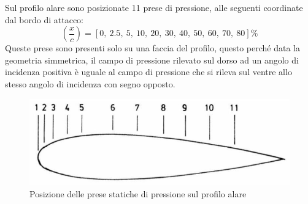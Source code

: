 \noindent Sul profilo alare sono posizionate 11 prese di pressione, alle seguenti coordinate dal bordo di attacco:
\begin{equation*}
    \left( \frac xc \right) = [0,\ 2.5,\ 5,\ 10,\ 20,\ 30,\ 40,\ 50,\ 60,\ 70,\ 80] \%
\end{equation*}
Queste prese sono presenti solo su una faccia del profilo, questo perché data la geometria simmetrica, il campo di pressione rilevato sul dorso ad un angolo di incidenza positiva è uguale al campo di pressione che si rileva sul ventre allo stesso angolo di incidenza con segno opposto.
\begin{figure}[h]
    \centering
    \includegraphics[width=.8\textwidth]{images/5/posizioneprese.png}
    \caption{Posizione delle prese statiche di pressione sul profilo alare}
\end{figure}

